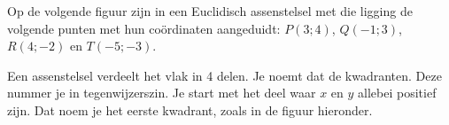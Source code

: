 
Op de volgende figuur zijn in een Euclidisch assenstelsel met die ligging de volgende punten met hun co\"ordinaten aangeduidt: $P(3;4)$, $Q(-1;3)$, $R(4;-2)$ en $T(-5;-3)$.




Een assenstelsel verdeelt het vlak in 4 delen.
Je noemt dat de kwadranten.
Deze nummer je in tegenwijzerszin. 
Je start met het deel waar $x$ en $y$ allebei positief zijn.
Dat noem je het eerste kwadrant, zoals in de figuur hieronder.

\begin{minipage}{.5\linewidth}
\end{minipage}
\begin{minipage}{.5\linewidth}
\begin{center}
		
\end{center}
\end{minipage}
